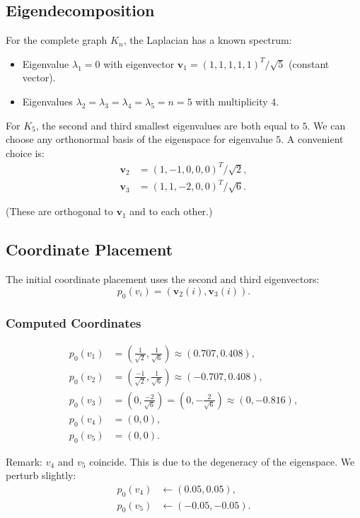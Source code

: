 \documentclass[11pt]{article}
\theoremstyle{definition}
\begin{document}
\subsection{Eigendecomposition}

For the complete graph $K_n$, the Laplacian has a known spectrum:
\begin{itemize}
  \item Eigenvalue $\lambda_1 = 0$ with eigenvector $\mathbf{v}_1 = (1, 1, 1, 1, 1)^T / \sqrt{5}$ (constant vector).
  \item Eigenvalues $\lambda_2 = \lambda_3 = \lambda_4 = \lambda_5 = n = 5$ with multiplicity $4$.
\end{itemize}

For $K_5$, the second and third smallest eigenvalues are both equal to $5$. We can choose any orthonormal basis of the eigenspace for eigenvalue $5$. A convenient choice is:
\begin{align*}
\mathbf{v}_2 &= (1, -1, 0, 0, 0)^T / \sqrt{2},\\
\mathbf{v}_3 &= (1, 1, -2, 0, 0)^T / \sqrt{6}.
\end{align*}

(These are orthogonal to $\mathbf{v}_1$ and to each other.)

\subsection{Coordinate Placement}

The initial coordinate placement uses the second and third eigenvectors:
\[
p_0(v_i) = (\mathbf{v}_2(i), \mathbf{v}_3(i)).
\]

\subsubsection{Computed Coordinates}

\begin{align*}
p_0(v_1) &= \left(\frac{1}{\sqrt{2}}, \frac{1}{\sqrt{6}}\right) \approx (0.707, 0.408),\\
p_0(v_2) &= \left(\frac{-1}{\sqrt{2}}, \frac{1}{\sqrt{6}}\right) \approx (-0.707, 0.408),\\
p_0(v_3) &= \left(0, \frac{-2}{\sqrt{6}}\right) = \left(0, -\frac{2}{\sqrt{6}}\right) \approx (0, -0.816),\\
p_0(v_4) &= (0, 0),\\
p_0(v_5) &= (0, 0).
\end{align*}

Remark: $v_4$ and $v_5$ coincide. This is due to the degeneracy of the eigenspace. We perturb slightly:
\begin{align*}
p_0(v_4) &\leftarrow (0.05, 0.05),\\
p_0(v_5) &\leftarrow (-0.05, -0.05).
\end{align*}
\end{document}
